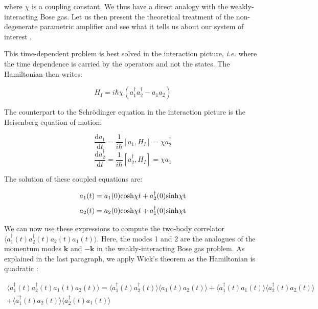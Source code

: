 \noindent where $\chi$ is a coupling constant. We thus have a direct analogy with the weakly-interacting Bose gas. Let us then present the theoretical treatment of the non-degenerate parametric amplifier and see what it tells us about our system of interest \cite{hodgman2017solving}. 

This time-dependent problem is best solved in the interaction picture, {\it i.e.} where the time dependence is carried by the operators and not the states. The Hamiltonian then writes:

\begin{equation}
    H_I=i \hbar \chi (a_1^{\dagger}  a_2^{\dagger} - a_1 a_2)
\end{equation}

The counterpart to the Schrödinger equation in the interaction picture is the Heisenberg equation of motion:

\begin{equation}
    \frac{\mathrm{d}a_1}{\mathrm{d}t}= \frac{1}{i\hbar} [a_1,H_I]=\chi a_2^{\dagger}
\end{equation}
\begin{equation}
    \frac{\mathrm{d}a_2^{\dagger}}{\mathrm{d}t}= \frac{1}{i\hbar} [a_2^{\dagger},H_I]=\chi a_1
\end{equation}

The solution of these coupled equations are:

\begin{equation}
    a_1(t)=a_1(0) \mathrm{cosh} \chi t + a_2^{\dagger}(0) \rm{sinh} \chi t
\end{equation}
\begin{equation}
    a_2(t)=a_2(0) \mathrm{cosh} \chi t + a_1^{\dagger}(0) \rm{sinh} \chi t
\end{equation}

We can now use these expressions to compute the two-body correlator $\langle a_1^{\dagger}(t) a_2^{\dagger}(t) a_2(t) a_1(t) \rangle$. Here, the modes 1 and 2 are the analogues of the momentum modes $\bm{k}$ and $-\bm{k}$ in the weakly-interacting Bose gas problem. As explained in the last paragraph, we apply Wick's theorem as the Hamiltonian is quadratic :

\begin{equation}
\begin{split}
    \langle a_1^{\dagger}(t) a_2^{\dagger}(t) a_1(t) a_2(t) \rangle = \langle a_1^{\dagger}(t) a_2^{\dagger}(t) \rangle \langle a_1(t) a_2(t) \rangle +  \langle a_1^{\dagger}(t) a_1(t) \rangle \langle a_2^{\dagger}(t) a_2(t) \rangle \\
    +  \langle a_1^{\dagger}(t) a_2(t) \rangle \langle a_2^{\dagger}(t) a_1(t) \rangle
\end{split}
\end{equation}




